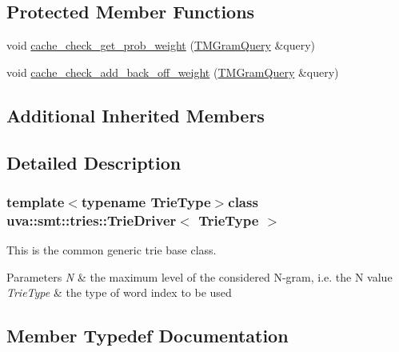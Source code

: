 \subsection*{Protected Member Functions}
\begin{DoxyCompactItemize}
\item 
void \hyperlink{classuva_1_1smt_1_1tries_1_1_trie_driver_ac6e5b92b96120acbc82e0c30d580c597}{cache\+\_\+check\+\_\+get\+\_\+prob\+\_\+weight} (\hyperlink{classuva_1_1smt_1_1tries_1_1_trie_driver_ab7b70ba376d851025035ca71ebe54725}{T\+M\+Gram\+Query} \&query)
\item 
void \hyperlink{classuva_1_1smt_1_1tries_1_1_trie_driver_a66c005edc46556ecf3b867f01ea9ef51}{cache\+\_\+check\+\_\+add\+\_\+back\+\_\+off\+\_\+weight} (\hyperlink{classuva_1_1smt_1_1tries_1_1_trie_driver_ab7b70ba376d851025035ca71ebe54725}{T\+M\+Gram\+Query} \&query)
\end{DoxyCompactItemize}
\subsection*{Additional Inherited Members}


\subsection{Detailed Description}
\subsubsection*{template$<$typename Trie\+Type$>$class uva\+::smt\+::tries\+::\+Trie\+Driver$<$ Trie\+Type $>$}

This is the common generic trie base class. 
\begin{DoxyParams}{Parameters}
{\em N} & the maximum level of the considered N-\/gram, i.\+e. the N value \\
\hline
{\em Trie\+Type} & the type of word index to be used \\
\hline
\end{DoxyParams}


\subsection{Member Typedef Documentation}
\hypertarget{classuva_1_1smt_1_1tries_1_1_trie_driver_ab7b70ba376d851025035ca71ebe54725}{}
